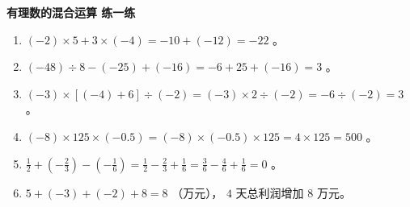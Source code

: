 \begin{answer}
\textbf{有理数的混合运算 练一练}

\begin{enumerate}
  \item $(-2) \times 5 + 3 \times (-4) = -10 + (-12) = -22$ 。
  \item $(-48) \div 8 - (-25) + (-16) = -6 + 25 + (-16) = 3$ 。
  \item $(-3) \times [(-4) + 6] \div (-2) = (-3) \times 2 \div (-2) = -6 \div (-2) = 3$ 。
  \item $(-8) \times 125 \times (-0.5) = (-8) \times (-0.5) \times 125 = 4 \times 125 = 500$ 。
  \item $\frac{1}{2} + \left(-\frac{2}{3}\right) - \left(-\frac{1}{6}\right) = \frac{1}{2} - \frac{2}{3} + \frac{1}{6} = \frac{3}{6} - \frac{4}{6} + \frac{1}{6} = 0$ 。
  \item $5 + (-3) + (-2) + 8 = 8$ （万元）， $4$ 天总利润增加 $8$ 万元。
\end{enumerate}


\end{answer}
